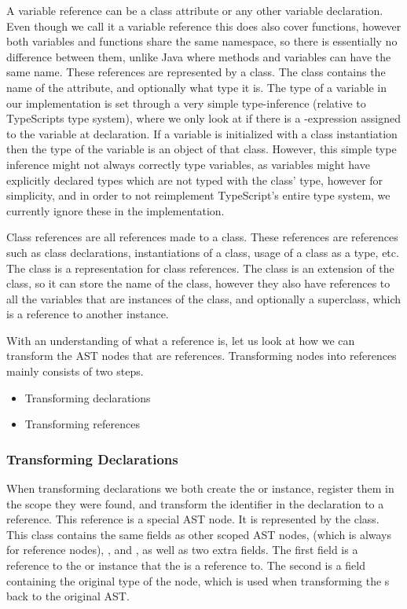 A variable reference can be a class attribute or any other variable declaration.
Even though we call it a variable reference this does also cover functions, however both variables and functions share the same namespace, so there is essentially no difference between them, unlike Java where methods and variables can have the same name.
These references are represented by a  class.
The class contains the name of the attribute, and optionally what type it is.
The type of a variable in our implementation is set through a very simple type-inference (relative to TypeScripts type system), where we only look at if there is a -expression assigned to the variable at declaration.
If a variable is initialized with a class instantiation then the type of the variable is an object of that class.
However, this simple type inference might not always correctly type variables, as variables might have explicitly declared types which are not typed with the class' type, however for simplicity, and in order to not reimplement TypeScript's entire type system, we currently ignore these in the implementation.

Class references are all references made to a class.
These references are references such as class declarations, instantiations of a class, usage of a class as a type, etc.
The  class is a representation for class references.
The class is an extension of the  class, so it can store the name of the class, however they also have references to all the variables that are instances of the class, and optionally a superclass, which is a reference to another  instance.

With an understanding of what a reference is, let us look at how we can transform the AST nodes that are references.
Transforming nodes into references mainly consists of two steps.

\begin{itemize}
    \item Transforming declarations
    \item Transforming references
\end{itemize}

\subsubsection{Transforming Declarations}

When transforming declarations we both create the  or  instance, register them in the scope they were found, and transform the identifier in the declaration to a reference.
This reference is a special AST node.
It is represented by the  class.
This class contains the same fields as other scoped AST nodes,  (which is always  for reference nodes), ,  and , as well as two extra fields.
The first field is a reference to the  or  instance that the  is a reference to.
The second is a field containing the original type of the node, which is used when transforming the s back to the original AST\@.


